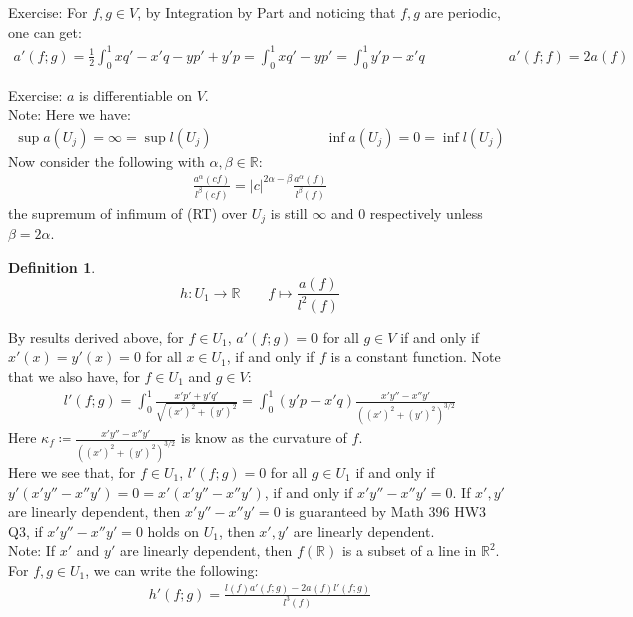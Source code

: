 \documentclass[11pt,oneside]{book}
\theoremstyle{break}
\theoremstyle{break}
\newtheorem{defn}{Definition}[corL]
\newcommand{\R}{\mathbb{R}}
\newcommand{\lr}[1]{\left(#1\right)}
\newcommand{\note}{\color{red}Note: \color{black}}
\newcommand{\exercise}{\color{green}Exercise: \color{black}}
\begin{document}
\exercise For $f,g \in V$, by Integration by Part and noticing that $f,g$ are periodic, one can get:
\begin{align*}
a'(f;g) = \frac{1}{2} \int_0^1 xq' - x'q - yp' + y' p = \int_0^1 xq' - yp' = \int_0^1 y'p - x'q \qquad \qquad \qquad 
a'(f;f) = 2a(f)
\end{align*}

\exercise $a$ is differentiable on $V$. \\

\note Here we have:
\begin{align*}
\sup a(U_j) = \infty  = \sup l(U_j) \qquad\qquad\qquad\qquad \inf a(U_j) = 0 = \inf l(U_j)
\end{align*}
Now consider the following with $\alpha,\beta \in \R$:
\begin{align*}
\frac{a^\alpha (cf)}{l^\beta (cf)} = |c|^{2\alpha - \beta} \frac{a^\alpha(f)}{l^{\beta}(f)} \tag{RT}
\end{align*}
the supremum of infimum of (RT) over $U_j$ is still $\infty$ and $0$ respectively unless $\beta = 2\alpha$. \\

\begin{defn}
$$h:U_1 \to \R \qquad f \mapsto \frac{a(f)}{l^2(f)}$$
\end{defn}
By results derived above, for $f \in U_1$, $a'(f;g) = 0$ for all $g \in V$ if and only if $x'(x) = y'(x) = 0$ for all $x \in U_1$, if and only if $f$ is a constant function. Note that we also have, for $f \in U_1$ and $g \in V$:
\begin{align*}
l'(f;g) = \int_0^1 \frac{x'p'+y'q'}{\sqrt{(x')^2 + (y')^2}} = \int_0^1 (y'p - x'q) \frac{x'y'' - x'' y'}{\lr{(x')^2 + (y')^2}^{3/2}}
\end{align*}
Here $\kappa_f \coloneqq \frac{x'y'' - x'' y'}{\lr{(x')^2 + (y')^2}^{3/2}} $ is know as the curvature of $f$. \\

Here we see that, for $f \in U_1$, $l'(f;g) = 0$ for all $g \in U_1$ if and only if $y'(x'y''-x''y') = 0 = x'(x'y''-x''y')$, if and only if $x'y'' - x'' y' = 0$. If $x',y'$ are linearly dependent, then $x'y'' - x''y' = 0$ is guaranteed by Math 396 HW3 Q3, if $x'y'' - x''y' =0$ holds on $U_1$, then $x', y'$ are linearly dependent. \\

\note If $x'$ and $y'$ are linearly dependent, then $f(\R)$ is a subset of a line in $\R^2$. \\

For $f,g \in U_1$, we can write the following:
\begin{align*}
h'(f;g) = \frac{l(f)a'(f;g)-2a(f)l'(f;g)}{l^3(f)}
\end{align*} 
\end{document}
